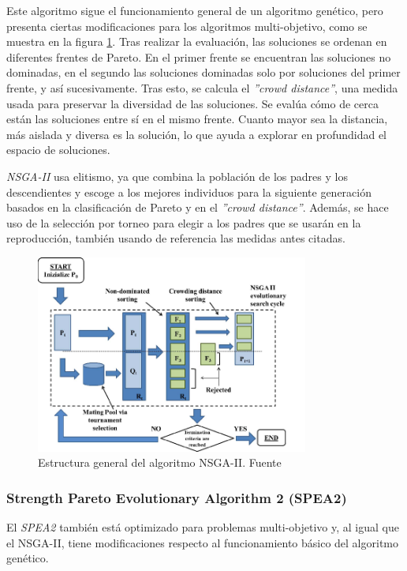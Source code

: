 Este algoritmo sigue el funcionamiento general de un algoritmo genético, pero presenta ciertas modificaciones para los algoritmos multi-objetivo, como se muestra en la figura \ref{fig:nsga2}. Tras realizar la evaluación, las soluciones se ordenan en diferentes frentes de Pareto. En el primer frente se encuentran las soluciones no dominadas, en el segundo las soluciones dominadas solo por soluciones del primer frente, y así sucesivamente. Tras esto, se calcula el \textit{''crowd distance''}, una medida usada para preservar la diversidad de las soluciones. Se evalúa cómo de cerca están las soluciones entre sí en el mismo frente. Cuanto mayor sea la distancia, más aislada y diversa es la solución, lo que ayuda a explorar en profundidad el espacio de soluciones.

\textit{NSGA-II} usa elitismo, ya que combina la población de los padres y los descendientes y escoge a los mejores individuos para la siguiente generación basados en la clasificación de Pareto y en el \textit{''crowd distance''}. Además, se hace uso de la selección por torneo para elegir a los padres que se usarán en la reproducción, también usando de referencia las medidas antes citadas.

\begin{figure}[H]
  \centering
  \includegraphics[width=0.8\textwidth]{figures/nsga2.png}
  \caption{Estructura general del algoritmo NSGA-II. Fuente \cite{nsga2_imagen}}
  \label{fig:nsga2}
\end{figure}

\subsubsection{Strength Pareto Evolutionary Algorithm 2 (SPEA2)}
\label{ch:spea2}

El \textit{SPEA2} también está optimizado para problemas multi-objetivo y, al igual que el NSGA-II, tiene modificaciones respecto al funcionamiento básico del algoritmo genético.

